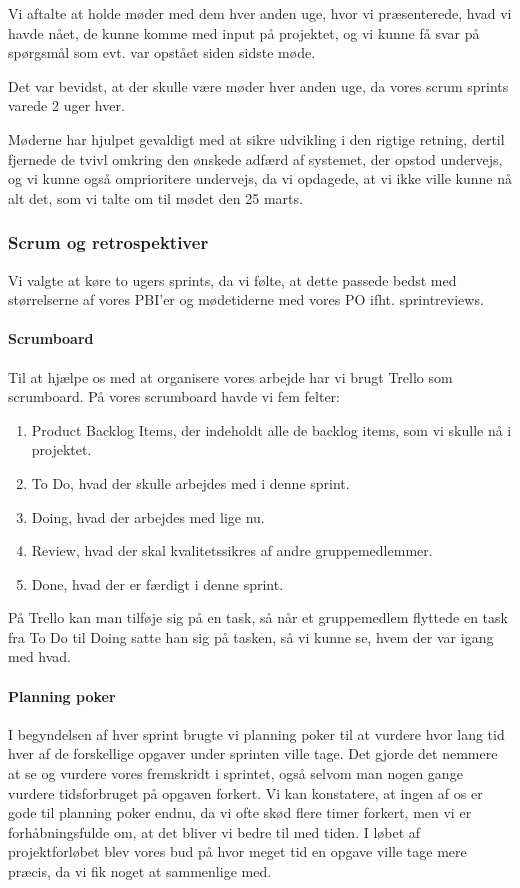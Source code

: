 Vi aftalte at holde møder med dem hver anden uge, hvor vi præsenterede, hvad vi havde nået, de kunne komme med input på projektet, og vi kunne få svar på spørgsmål som evt. var opstået siden sidste møde.

Det var bevidst, at der skulle være møder hver anden uge, da vores scrum sprints varede 2 uger hver.

Møderne har hjulpet gevaldigt med at sikre udvikling i den rigtige retning, dertil fjernede de tvivl omkring den ønskede adfærd af systemet, der opstod undervejs, og vi kunne også omprioritere undervejs, da vi opdagede, at vi ikke ville kunne nå alt det, som vi talte om til mødet den 25 marts.



\subsubsection{Scrum og retrospektiver}

Vi valgte at køre to ugers sprints, da vi følte, at dette passede bedst med størrelserne af vores PBI'er og mødetiderne med vores PO ifht. sprintreviews.

\paragraph*{Scrumboard}
Til at hjælpe os med at organisere vores arbejde har vi brugt Trello som scrumboard.
På vores scrumboard havde vi fem felter:
\begin{enumerate}
    \item Product Backlog Items, der indeholdt alle de backlog items, som vi skulle nå i projektet.
    \item To Do, hvad der skulle arbejdes med i denne sprint.
    \item Doing, hvad der arbejdes med lige nu.
    \item Review, hvad der skal kvalitetssikres af andre gruppemedlemmer.
    \item Done, hvad der er færdigt i denne sprint.
\end{enumerate}

På Trello kan man tilføje sig på en task, så når et gruppemedlem flyttede en task fra To Do til Doing satte han sig på tasken, så vi kunne se, hvem der var igang med hvad.

\paragraph*{Planning poker}
I begyndelsen af hver sprint brugte vi planning poker til at vurdere hvor lang tid hver af de forskellige opgaver under sprinten ville tage.
Det gjorde det nemmere at se og vurdere vores fremskridt i sprintet, også selvom man nogen gange vurdere tidsforbruget på opgaven forkert.
Vi kan konstatere, at ingen af os er gode til planning poker endnu, da vi ofte skød flere timer forkert, men vi er forhåbningsfulde om, at det bliver vi bedre til med tiden.
I løbet af projektforløbet blev vores bud på hvor meget tid en opgave ville tage mere præcis, da vi fik noget at sammenlige med.


